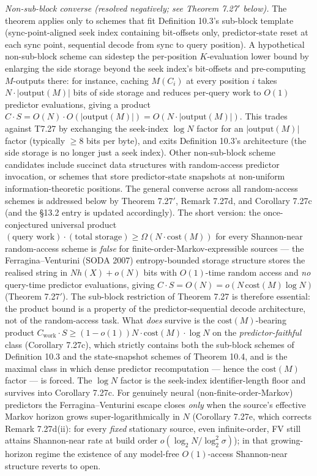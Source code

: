 \documentclass[
]{article}
\begin{document}
\emph{Non-sub-block converse (resolved negatively; see Theorem 7.27$'$ below).} The theorem applies only to
schemes that fit Definition 10.3's sub-block template
(sync-point-aligned seek index containing bit-offsets only,
predictor-state reset at each sync point, sequential decode from
sync to query position). A hypothetical non-sub-block scheme can
sidestep the per-position $K$-evaluation lower bound by enlarging
the side storage beyond the seek index's bit-offsets and
pre-computing $M$-outputs there: for instance, caching $M(C_i)$ at
every position $i$ takes $N \cdot |\mathrm{output}(M)|$ bits of side
storage and reduces per-query work to $O(1)$ predictor evaluations,
giving a product $C \cdot S = O(N) \cdot O(|\mathrm{output}(M)|) =
O(N \cdot |\mathrm{output}(M)|)$. This trades against T7.27 by
exchanging the seek-index $\log N$ factor for an $|\mathrm{output}(M)|$
factor (typically $\geq 8$ bits per byte), and exits Definition 10.3's
architecture (the side storage is no longer just a seek index).
Other non-sub-block scheme candidates include succinct data
structures with random-access predictor invocation, or schemes that
store predictor-state snapshots at non-uniform information-theoretic
positions. The general converse across all random-access schemes is
addressed below by Theorem 7.27$'$, Remark 7.27d, and Corollary 7.27c
(and the §13.2 entry is updated accordingly). The short version: the
once-conjectured universal product $(\text{query work}) \cdot
(\text{total storage}) \geq \Omega(N \cdot \mathrm{cost}(M))$ for every
Shannon-near random-access scheme is \emph{false} for
finite-order-Markov-expressible sources --- the Ferragina--Venturini
(SODA 2007) entropy-bounded storage structure stores the realised string
in $N h(X) + o(N)$ bits with $O(1)$-time random access and \emph{no}
query-time predictor evaluations, giving $C \cdot S = O(N) = o(N\,
\mathrm{cost}(M)\log N)$ (Theorem 7.27$'$). The sub-block restriction of
Theorem 7.27 is therefore essential: the product bound is a property of
the predictor-sequential decode architecture, not of the random-access
task. What \emph{does} survive is the $\mathrm{cost}(M)$-bearing product
$C_{\mathrm{work}} \cdot S \geq (1-o(1)) N \cdot \mathrm{cost}(M) \cdot
\log N$ on the \emph{predictor-faithful} class (Corollary 7.27c), which
strictly contains both the sub-block schemes of Definition 10.3 and the
state-snapshot schemes of Theorem 10.4, and is the maximal class in
which dense predictor recomputation --- hence the $\mathrm{cost}(M)$
factor --- is forced. The $\log N$ factor is the seek-index
identifier-length floor and survives into Corollary 7.27c. For
genuinely neural (non-finite-order-Markov) predictors the
Ferragina--Venturini escape closes \emph{only} when the source's
effective Markov horizon grows super-logarithmically in $N$ (Corollary
7.27e, which corrects Remark 7.27d(ii): for every \emph{fixed} stationary
source, even infinite-order, FV still attains Shannon-near rate at build
order $o(\log_2 N/\log_2^2\sigma)$); in that growing-horizon regime the
existence of any model-free $O(1)$-access Shannon-near structure reverts
to open.
\end{document}
